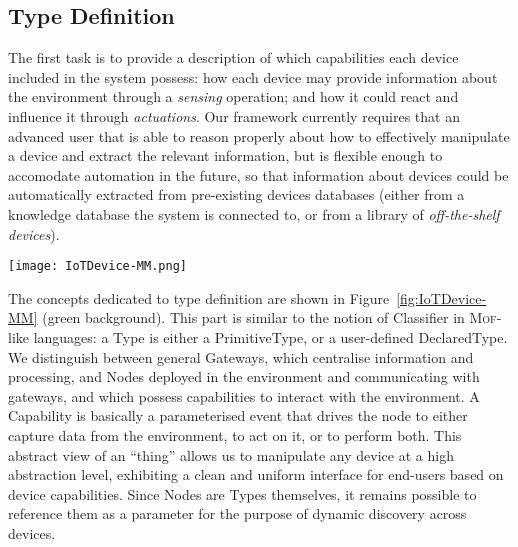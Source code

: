 \subsection{Type Definition}
\label{sec:IoTDSL-TD}

The first task is to provide a description of which capabilities each device included in the \IOT system possess: how each device may provide information about the environment through a \emph{sensing} operation; and how it could react and influence it through \emph{actuations}. Our framework currently requires that an advanced user that is able to reason properly about how to effectively manipulate a device and extract the relevant information, but is flexible enough to accomodate automation in the future, so that information about devices could be automatically extracted from pre-existing devices databases (either from a knowledge database the \IOT system is connected to, or from a library of \emph{off-the-shelf devices}).


\begin{figure*}%
  \centering  
  \texttt{[image: IoTDevice-MM.png]}%
  \caption{Metamodel of \IOTDSL, separated in three concerns: \emph{Type Definition} captures devices' capabilities (top green part), \emph{Network Configuration} details how device instances are connected to each others (middle purple part), \emph{Business Rules} defines the functionalities expected from the IoT installation (bottom yellow part).}%
  \label{fig:IoTDevice-MM}%
\end{figure*}

The concepts dedicated to type definition are shown in Figure~\ref{fig:IoTDevice-MM} (green background). This part is similar to the notion of \textsf{Classifier} in \textsc{Mof}-like languages: a \textsf{Type} is either a \textsf{PrimitiveType}, or a user-defined \textsf{DeclaredType}. We distinguish between general \textsf{Gateway}s, which centralise information and processing, and \textsf{Node}s deployed in the environment and communicating with gateways, and which possess capabilities to interact with the environment. A \textsf{Capability} is basically a parameterised event that drives the node to either capture data from the environment, to act on it, or to perform both. This abstract view of an ``thing'' allows us to manipulate any device at a high abstraction level, exhibiting a clean and uniform interface for end-users based on device capabilities. Since \textsf{Node}s are \textsf{Type}s themselves, it remains possible to reference them as a parameter for the purpose of dynamic discovery across devices.

